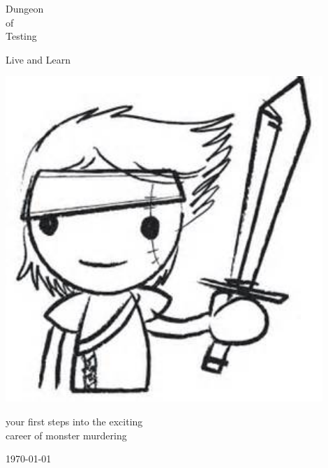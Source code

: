\begin{center}

\huge         Dungeon  \\
                of     \\
              Testing   

\vspace{0.3\baselineskip}

\large     Live and Learn

\vspace{2cm}

\includegraphics[width=120mm]{./fig/noob.jpg}

\vspace{2 cm}


\normalsize
          your first steps into the exciting    \\
            career of monster murdering

\vfill

\today

\end{center}






\clearpage
\thispagestyle{empty}
\raggedbottom

